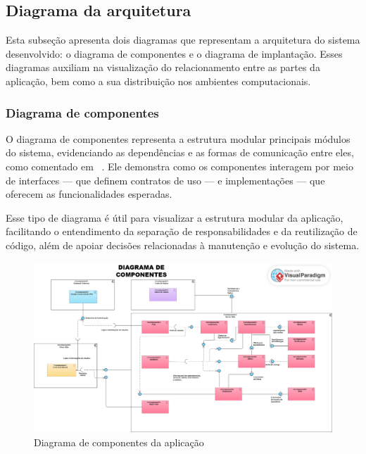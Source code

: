 \subsection{Diagrama da arquitetura}

Esta subseção apresenta dois diagramas que representam a arquitetura do sistema desenvolvido: o diagrama de componentes e o diagrama de implantação. Esses diagramas auxiliam na visualização do relacionamento entre as partes da aplicação, bem como a sua distribuição nos ambientes computacionais.

\subsubsection{Diagrama de componentes}

O diagrama de componentes representa a estrutura modular principais módulos do sistema, evidenciando as dependências e as formas de comunicação entre eles, como comentado em ~\cite{Booch2005}. Ele demonstra como os componentes interagem por meio de interfaces — que definem contratos de uso — e implementações — que oferecem as funcionalidades esperadas.

Esse tipo de diagrama é útil para visualizar a estrutura modular da aplicação, facilitando o entendimento da separação de responsabilidades e da reutilização de código, além de apoiar decisões relacionadas à manutenção e evolução do sistema.

\begin{figure}[htb]
  \centering
  \includegraphics[width=\textwidth]{cap04-desenvolvimento/images/4-3-2-1-diagrama-componentes}
  \caption{Diagrama de componentes da aplicação}
  \label{fig:diagrama-componente}
\end{figure}
\FloatBarrier


